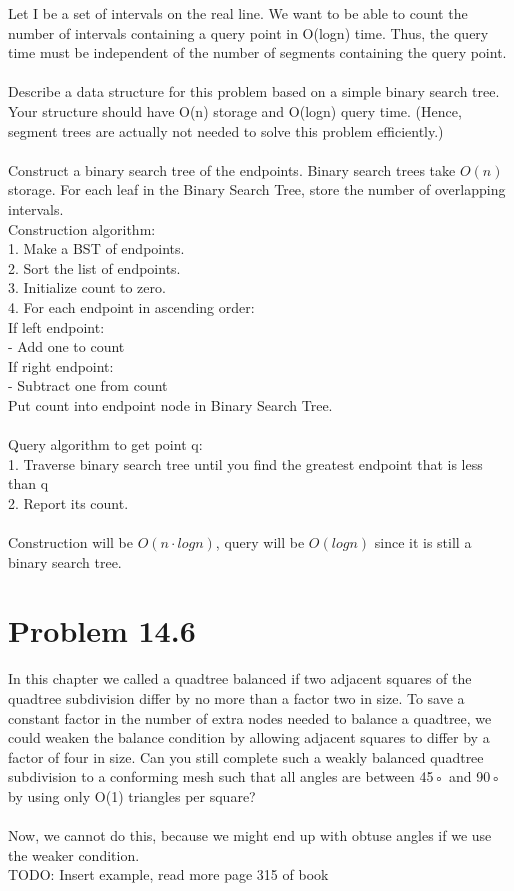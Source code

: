 \documentclass[11pt,psfig]{article}
\begin{document}
Let I be a set of intervals on the real line. We want to be able to count the
number of intervals containing a query point in O(logn) time. Thus, the
query time must be independent of the number of segments containing
the query point.\\
\\
Describe a data structure for this problem based on a simple binary
search tree. Your structure should have O(n) storage and O(logn)
query time. (Hence, segment trees are actually not needed to solve
this problem efficiently.)\\
\\
Construct a binary search tree of the endpoints. Binary search trees take $O(n)$ storage. For each leaf in the Binary Search Tree, store the number of overlapping intervals. \\
Construction algorithm:\\
1. Make a BST of endpoints. \\
2. Sort the list of endpoints. \\
3. Initialize count to zero. \\
4. For each endpoint in ascending order:\\
If left endpoint: \\
- Add one to count\\
If right endpoint: \\
- Subtract one from count\\
Put count into endpoint node in Binary Search Tree. \\
\\
Query algorithm to get point q:\\
1. Traverse binary search tree until you find the greatest endpoint that is less than q\\
2. Report its count. \\
\\
Construction will be $O(n \cdot logn)$, query will be $O(logn)$ since it is still a binary search tree. 

\section*{Problem 14.6}

In this chapter we called a quadtree balanced if two adjacent squares of
the quadtree subdivision differ by no more than a factor two in size. To
save a constant factor in the number of extra nodes needed to balance a
quadtree, we could weaken the balance condition by allowing adjacent
squares to differ by a factor of four in size. Can you still complete such
a weakly balanced quadtree subdivision to a conforming mesh such that
all angles are between 45◦ and 90◦ by using only O(1) triangles per
square?\\
\\
Now, we cannot do this, because we might end up with obtuse angles if we use the weaker condition. \\
TODO: Insert example, read more page 315 of book
\end{document}
